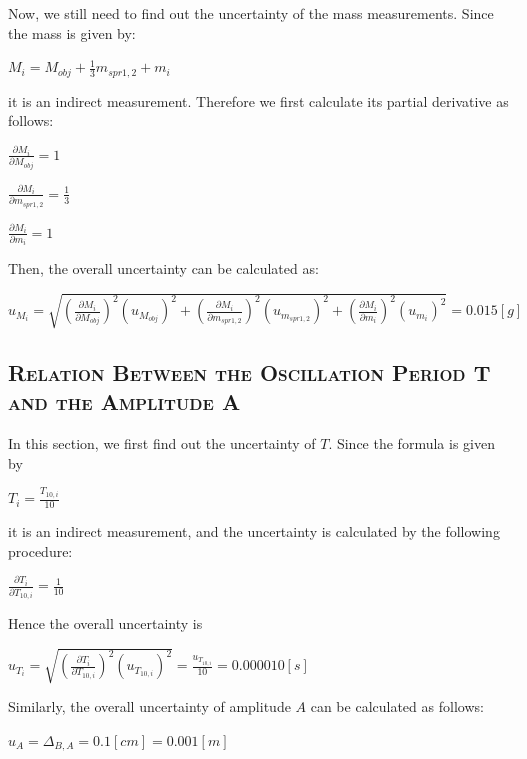 \documentclass[a4paper,12pt]{article}
\begin{document}
\begin{appendices}
\par Now, we still need to find out the uncertainty of the mass measurements. Since the mass is given by:
\begin{center}
$ M_i = M_{obj} + \frac{1}{3}m_{spr1,2} + m_i$
\end{center}
it is an indirect measurement. Therefore we first calculate its partial derivative as follows:
\begin{center}
$\displaystyle \frac{\partial M_i}{\partial M_{obj}} = 1$
\end{center}
\begin{center}
$\displaystyle \frac{\partial M_i}{\partial m_{spr1,2}} = \frac{1}{3}$
\end{center}
\begin{center}
$\displaystyle \frac{\partial M_i}{\partial m_{i}} = 1$
\end{center}
\par Then, the overall uncertainty can be calculated as:
\begin{center}
$\displaystyle u_{M_i} = \sqrt{(\frac{\partial M_i}{\partial M_{obj}})^2(u_{M_{obj}})^2 + (\frac{\partial M_i}{\partial m_{spr1,2}})^2(u_{m_{spr1,2}})^2 + (\frac{\partial M_i}{\partial m_{i}})^2(u_{m_i})^2} = 0.015[g]$
\end{center}
\subsection{\textsc{Relation Between the Oscillation Period T and the Amplitude A}}
In this section, we first find out the uncertainty of $T$. Since the formula is given by 
\begin{center}
$\displaystyle T_i = \frac{T_{10,i}}{10} $
\end{center}
it is an indirect measurement, and the uncertainty is calculated by the following procedure:
\begin{center}
$\displaystyle \frac{\partial T_i}{\partial T_{10,i}} = \frac{1}{10} $
\end{center}
Hence the overall uncertainty is 
\begin{center}
$\displaystyle u_{T_i} = \sqrt{(\frac{\partial T_i}{\partial T_{10,i}})^2(u_{T_{10,i}})^2} = \frac{u_{T_{10,i}}}{10} = 0.000010 [s]$
\end{center}
\par Similarly, the overall uncertainty of amplitude $A$ can be calculated as follows:
\begin{center}
$ u_A = \Delta_{B,A} = 0.1 [cm] = 0.001 [m] $
\end{center}

\end{appendices}
\end{document}
